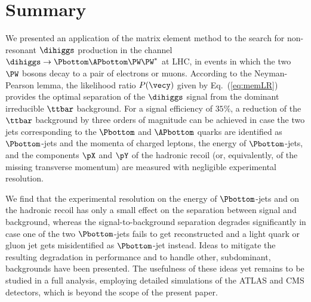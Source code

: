 \section{Summary}
\label{sec:summary}

We presented an application of the matrix element method 
to the search for non-resonant $\dihiggs$ production in the channel $\dihiggs \to \Pbottom\APbottom\PW\PW^{*}$ at LHC,
in events in which the two $\PW$ bosons decay to a pair of electrons or muons.
According to the Neyman-Pearson lemma,
the likelihood ratio $P(\vecy)$ given by Eq.~(\ref{eq:memLR}) provides the optimal separation of the $\dihiggs$ signal from the dominant irreducible $\ttbar$ background.
For a signal efficiency of $35\%$,
a reduction of the $\ttbar$ background by three orders of magnitude can be achieved in case the two jets corresponding to the $\Pbottom$ and $\APbottom$ quarks are identified as $\Pbottom$-jets
and the momenta of charged leptons, the energy of $\Pbottom$-jets, and the components $\pX$ and $\pY$ of the hadronic recoil (or, equivalently, of the missing transverse momentum)
are measured with negligible experimental resolution.

We find that the experimental resolution on the energy of $\Pbottom$-jets and on the hadronic recoil has only a small effect on the separation between signal and background,
whereas the signal-to-background separation degrades significantly in case one of the two $\Pbottom$-jets
fails to get reconstructed and a light quark or gluon jet gets misidentified as $\Pbottom$-jet instead.
Ideas to mitigate the resulting degradation in performance and to handle other, subdominant, backgrounds have been presented.
The usefulness of these ideas yet remains to be studied in a full analysis, employing detailed simulations of the ATLAS and CMS detectors, which is beyond the scope of the present paper.

